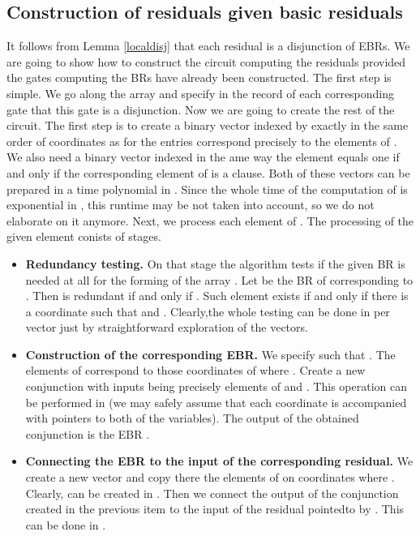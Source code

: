 \documentclass{llncs}
\begin{document}
\subsection{Construction of residuals given basic residuals}
It follows from Lemma \ref{localdisj} that each residual is a disjunction of EBRs. We are going to show how to construct
the circuit computing the residuals provided the gates computing the BRs have already been constructed. 
The first step is simple. We go along the array  and 
specify in the record of each corresponding gate that this gate is a disjunction. Now we are going to create
the rest of the circuit. The first step is to create a binary vector  indexed by  exactly in the
same order of coordinates as for  the  entries correspond precisely to the elements of . We also need a 
binary vector  indexed in the ame way the element equals one if and only if the corresponding element of
 is a clause. Both of these vectors can be prepared in a time polynomial in .
Since the whole time of the computation of  is exponential in , this runtime may be not taken into
account, so we do not elaborate on it anymore.  Next, we process each element of . The processing of the given
element  conists of  stages.
\begin{itemize}
\item {\bf Redundancy testing.} On that stage the algorithm tests if the given BR is needed at all for the forming
of the array . Let  be the BR of  corresponding to . Then  is redundant
if and only if . Such element exists if and only if there is a coordinate
 such that  and . Clearly,the whole testing can be done in  per vector 
just by straightforward exploration of the vectors.   
\item {\bf Construction of the corresponding EBR.}
We specify  such that . The elements of  correspond
to those coordinates  of  where . Create a new conjunction with inputs being precisely
elements of  and . This operation can be performed in  (we may safely assume that each coordinate
is accompanied with pointers to both of the variables). The output of the obtained conjunction is the EBR
. 
\item {\bf Connecting the EBR to the input of the corresponding residual.}
We create a new vector  and copy there the elements of  on coordinates  where .
Clearly,  can be created in . Then we connect the output of the conjunction created in the previous
item to the input of the residual pointedto by . This can be done in .     
\end{itemize}    
\end{document}
